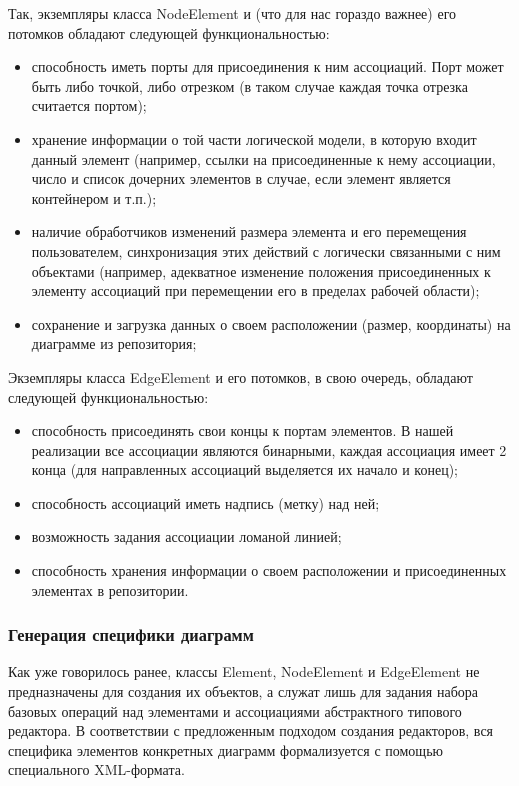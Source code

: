 \documentclass[a5paper]{article}
\begin{document}
Так, экземпляры класса NodeElement и (что для
нас гораздо важнее) его потомков обладают следующей функциональностью:

\begin{itemize}
  \item способность иметь порты для присоединения к ним ассоциаций. Порт может
        быть либо точкой, либо отрезком (в таком случае каждая точка отрезка
        считается портом);
  \item хранение информации о той части логической модели, в которую входит
        данный элемент (например, ссылки на присоединенные к нему ассоциации,
        число и список дочерних элементов в случае, если элемент является
        контейнером и т.п.);
  \item наличие обработчиков изменений размера элемента и его перемещения
        пользователем, синхронизация этих действий с логически связанными с ним
        объектами (например, адекватное изменение положения присоединенных к
        элементу ассоциаций при перемещении его в пределах рабочей области);
  \item сохранение и загрузка данных о своем расположении (размер, координаты)
        на диаграмме из репозитория;
\end{itemize}

Экземпляры класса EdgeElement и его потомков, в свою очередь, обладают следующей функциональностью:

\begin{itemize}
  \item способность присоединять свои концы к портам элементов. В нашей
        реализации все ассоциации являются бинарными, каждая ассоциация имеет 2
        конца (для направленных ассоциаций выделяется их начало и конец);
  \item способность ассоциаций иметь надпись (метку) над ней;
  \item возможность задания ассоциации ломаной линией;
  \item способность хранения информации о своем расположении и присоединенных
        элементах в репозитории.
\end{itemize}

\subsubsection{Генерация специфики диаграмм}

Как уже говорилось ранее, классы Element, NodeElement и
EdgeElement не предназначены для создания их объектов, а служат лишь для задания набора базовых операций над
элементами и ассоциациями абстрактного типового редактора. В
соответствии с предложенным подходом создания редакторов, вся специфика
элементов конкретных диаграмм формализуется с помощью специального
XML-формата.
\end{document}
